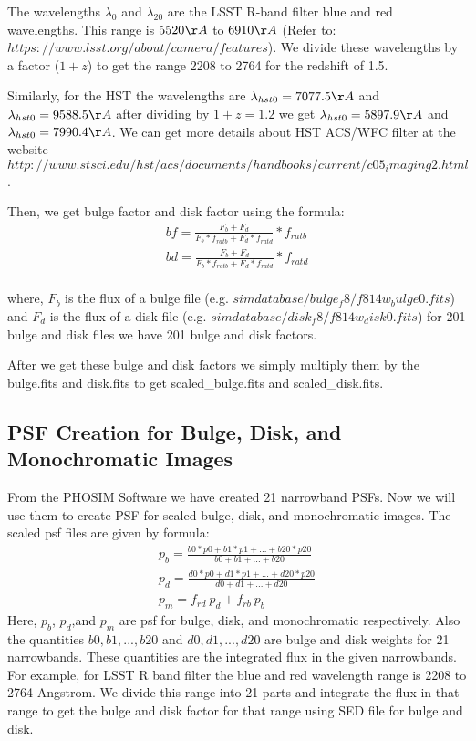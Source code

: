The wavelengths $\lambda_0$ and $\lambda_{20}$ are the LSST R-band filter blue and red wavelengths. This range is $5520 \AA$ to $6910 \AA$ (Refer to: $https://www.lsst.org/about/camera/features$).
We divide these wavelengths by a factor ($1 + z$) to get the range 2208 to 2764 for the redshift of 1.5.

Similarly, for the HST the wavelengths are $\lambda_{hst0} = 7077.5 \AA$ and $\lambda_{hst0} = 9588.5 \AA$ after dividing by $ 1 + z = 1.2$ we get $\lambda_{hst0} = 5897.9 \AA$ and $\lambda_{hst0} = 7990.4 \AA$. We can get more details about HST ACS/WFC filter at the website $http://www.stsci.edu/hst/acs/documents/handbooks/current/c05_imaging2.html$.

Then, we get bulge factor and disk factor using the formula:
 \begin{eqnarray}
 bf = \frac{F_b + F_d} {F_b * f_{ratb} + F_d * f_{ratd}} * f_{ratb} \\
 bd = \frac{F_b + F_d} {F_b * f_{ratb} + F_d * f_{ratd}} * f_{ratd} \\
 \end{eqnarray}
 
 where, $F_b$ is the flux of a bulge file (e.g. $simdatabase/bulge_f8/f814w_bulge0.fits$) and $F_d$ is the flux of a disk file (e.g. $simdatabase/disk_f8/f814w_disk0.fits$) for 201 bulge and disk files we have 201 bulge and disk factors.
 
After we get these bulge and disk factors we simply multiply them by the bulge.fits and disk.fits to get scaled\_bulge.fits and scaled\_disk.fits.

\subsection{PSF Creation for Bulge, Disk, and Monochromatic Images}
From the PHOSIM Software we have created 21 narrowband PSFs. Now we will use them to create PSF for scaled bulge, disk, and monochromatic images. The scaled psf files are given by formula:
\begin{eqnarray}
p_b = \frac{b0*p0 + b1*p1 + ... + b20*p20}{b0 + b1 + ... + b20} \\
p_d = \frac{d0*p0 + d1*p1 + ... + d20*p20}{d0 + d1 + ... + d20} \\
p_m = f_{rd} \ p_d + f_{rb} \ p_b
\end{eqnarray}
Here, $p_b$, $p_d$,and $p_m$ are psf for bulge, disk, and monochromatic respectively. Also the quantities $b0, b1, ..., b20$ and $d0, d1, ..., d20$ are bulge and disk weights for 21 narrowbands. These quantities are the integrated flux in the given narrowbands. For example, for LSST R band filter the blue and red wavelength range is 2208 to 2764 Angstrom. We divide this range into 21 parts and integrate the flux in that range to get the bulge and disk factor for that range using SED file for bulge and disk.

